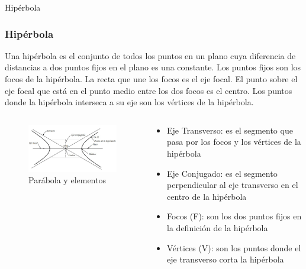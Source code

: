 \documentclass[xcolor={dvipsnames},aspectratio=169,10pt]{beamer}
\begin{document}
\begin{frame}{Hipérbola}
  \frametitle{Hipérbola}
    Una hipérbola es el conjunto de todos los puntos en un plano cuya diferencia de distancias a dos puntos fijos en el plano es una constante. 
    Los puntos fijos son los focos de la hipérbola. La recta que une los focos es el eje focal. El punto sobre el eje focal que está en el 
    punto medio entre los dos focos es el centro. Los puntos donde la hipérbola interseca a su eje son los vértices de la hipérbola.
    \begin{columns}
      \begin{column}{0.5\textwidth}
        \begin{figure}
          \includegraphics[width=\textwidth, height=0.6\textheight, keepaspectratio]{images/hyp1.png}
          \caption{Parábola y elementos}
        \end{figure}
      \end{column}
      \begin{column}{0.5\textwidth}
        \begin{itemize}
          \item Eje Transverso: es el segmento que pasa por los focos y los vértices de la hipérbola
          \item Eje Conjugado: es el segmento perpendicular al eje transverso en el centro de la hipérbola
          \item Focos (F): son los dos puntos fijos en la definición de la hipérbola
          \item Vértices (V): son los puntos donde el eje transverso corta la hipérbola
        \end{itemize}
      \end{column}
    \end{columns}
\end{frame}
\end{document}
